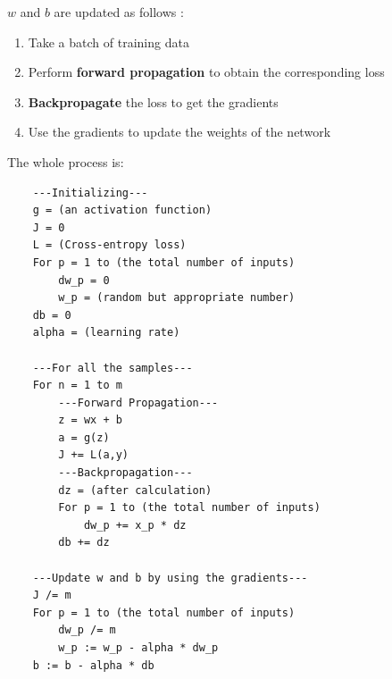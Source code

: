 \documentclass[11pt, a4paper]{article}
\begin{document}
\begin{tcolorbox}
$w$ and $b$ are updated as follows :
\begin{enumerate}
    \item Take a batch of training data
    \item Perform \textbf{forward propagation} to obtain the corresponding loss
    \item \textbf{Backpropagate} the loss to get the gradients
    \item Use the gradients to update the weights of the network
\end{enumerate}
\end{tcolorbox}
The whole process is:
\begin{verbatim}
    ---Initializing---
    g = (an activation function)
    J = 0
    L = (Cross-entropy loss)
    For p = 1 to (the total number of inputs)
        dw_p = 0
        w_p = (random but appropriate number)
    db = 0
    alpha = (learning rate)

    ---For all the samples---
    For n = 1 to m
        ---Forward Propagation---
        z = wx + b
        a = g(z)
        J += L(a,y)
        ---Backpropagation---
        dz = (after calculation)
        For p = 1 to (the total number of inputs)
            dw_p += x_p * dz
        db += dz
    
    ---Update w and b by using the gradients---
    J /= m
    For p = 1 to (the total number of inputs)
        dw_p /= m
        w_p := w_p - alpha * dw_p
    b := b - alpha * db
\end{verbatim}
\end{document}
